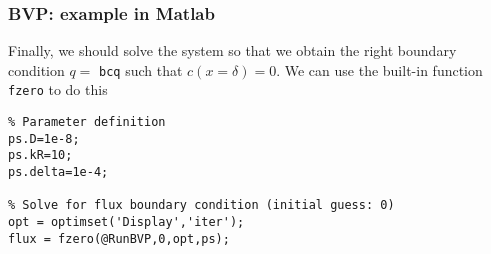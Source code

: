 \documentclass[11pt,table,final,fleqn,xcolor={usenames,dvipsnames,table}]{beamer}
\begin{document}
\begin{frame}[fragile]
  \frametitle{BVP: example in Matlab}
  Finally, we should solve the system so that we obtain the right boundary condition $q=$ \lstinline$bcq$ such that $c(x=\delta)=0$. We can use the built-in function \lstinline$fzero$ to do this
  \begin{lstlisting}
% Parameter definition
ps.D=1e-8;
ps.kR=10;
ps.delta=1e-4;

% Solve for flux boundary condition (initial guess: 0)
opt = optimset('Display','iter');
flux = fzero(@RunBVP,0,opt,ps);
  \end{lstlisting}
\end{frame}

\end{document}
